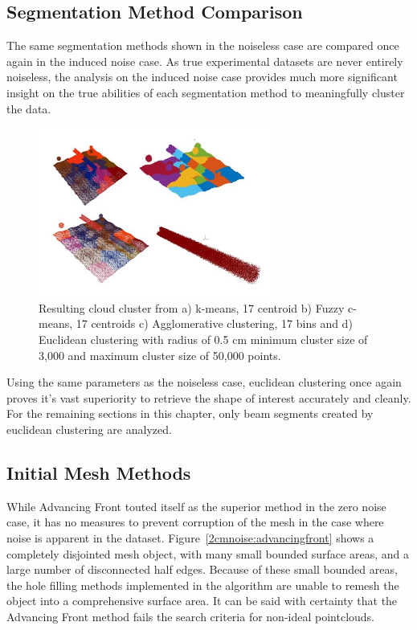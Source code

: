 \documentclass[12pt]{drexelthesis}
\let\Oldsubsection\subsection
\renewcommand{\subsection}{\FloatBarrier\Oldsubsection}
\begin{document}
\subsection{Segmentation Method Comparison}

The same segmentation methods shown in the noiseless case are compared once again in the induced noise case. As true experimental datasets are never entirely noiseless, the analysis on the induced noise case provides much more significant insight on the true abilities of each segmentation method to meaningfully cluster the data.

\begin{figure}[!ht]
	\centering
		\includegraphics[width=3in]{simulated-lab-scan/2cmnoise/comparison.jpg}
		\caption[Comparison of unsupervised segmentation techniques on simulated dataset with induced noise.]{\centering Resulting cloud cluster from a) k-means, 17 centroid b) Fuzzy c-means, 17 centroids c) Agglomerative clustering, 17 bins and d) Euclidean clustering with radius of 0.5 cm minimum cluster size of 3,000 and maximum cluster size of 50,000 points.}
\label{2cmnoise:segcompare}
\end{figure}

Using the same parameters as the noiseless case, euclidean clustering once again proves it's vast superiority to retrieve the shape of interest accurately and cleanly. For the remaining sections in this chapter, only beam segments created by euclidean clustering are analyzed.


\subsection{Initial Mesh Methods}

While Advancing Front touted itself as the superior method in the zero noise case, it has no measures to prevent corruption of the mesh in the case where noise is apparent in the dataset. Figure~\ref{2cmnoise:advancingfront} shows a completely disjointed mesh object, with many small bounded surface areas, and a large number of disconnected half edges. Because of these small bounded areas, the hole filling methods implemented in the algorithm are unable to remesh the object into a comprehensive surface area. It can be said with certainty that the Advancing Front method fails the search criteria for non-ideal pointclouds.
\end{document}
